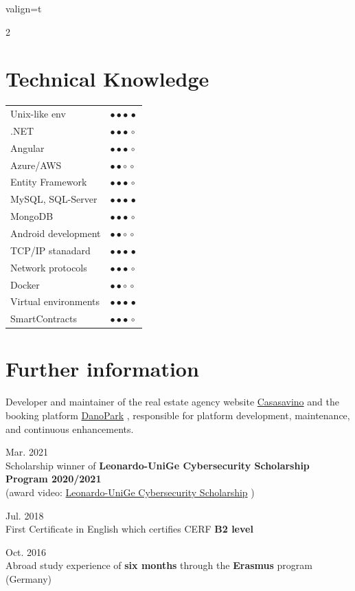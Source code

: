 \documentclass[a4paper,10pt]{article}
\newcommand{\myhref}[2]{%
\href{#1}{\textcolor{ColorTwo}{#2}}
}
\newcommand{\SkillBull}[1]{%
\textcolor{ColorTwo}{#1}
}
\begin{document}
\begin{adjustbox}{valign=t}
\begin{minipage}{0.6\textwidth}
\begin{multicols}{2}
\section*{Technical Knowledge}
\begin{tabular}{ll}
    Unix-like env	    & \SkillBull{$\bullet \bullet \bullet \, \bullet$}\\
	.NET		& \SkillBull{$\bullet \bullet \bullet \, \circ$}\\
	Angular  	& \SkillBull{$\bullet \bullet \bullet \, \circ$}\\
	Azure/AWS		& \SkillBull{$\bullet \bullet \circ \, \circ$}\\
	Entity Framework 	& \SkillBull{$\bullet \bullet \bullet \, \circ$}\\
	MySQL, SQL-Server   & \SkillBull{$\bullet \bullet \bullet \, \bullet$}\\
	MongoDB   	    & \SkillBull{$\bullet \bullet \bullet \, \circ$}\\
	Android development   	    & \SkillBull{$\bullet \bullet \circ \, \circ$}\\
	TCP/IP stanadard	    & \SkillBull{$\bullet \bullet \bullet \, \bullet$}\\
	Network protocols	    & \SkillBull{$\bullet \bullet \bullet \, \circ$}\\
	Docker	    & \SkillBull{$\bullet \bullet \circ \, \circ$}\\
	Virtual environments	    & \SkillBull{$\bullet \bullet \bullet \, \bullet$}\\
	SmartContracts & \SkillBull{$\bullet \bullet \bullet \, \circ$}\\
\end{tabular}
\end{multicols}
\section*{Further information}
Developer and maintainer of the real estate agency website 
\myhref{https://casasavino.it}{Casasavino} and the booking platform 
\myhref{https://danopark.it}{DanoPark}, responsible for platform development, maintenance, and continuous enhancements.

\begin{description}
    \raggedright    
	\item \textcolor{ColorOne}{Mar. 2021}\\
	Scholarship winner of \textbf{Leonardo-UniGe Cybersecurity Scholarship Program 2020/2021}\\
    (award video: \myhref{https://www.youtube.com/watch?v=gA4rcqAIaZg}{Leonardo-UniGe Cybersecurity Scholarship})
    \item \textcolor{ColorOne}{Jul. 2018}\\
    First Certificate in English which certifies CERF \textbf{B2 level}
    \item \textcolor{ColorOne}{Oct. 2016}\\
    Abroad study experience of \textbf{six months} through the \textbf{Erasmus} program (Germany)
\end{description}


\end{minipage}
\end{adjustbox}
\end{document}
